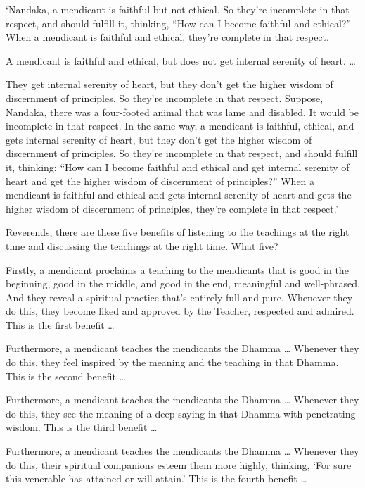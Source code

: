 \documentclass[12pt,openany]{book}%
\begin{document}
‘Nandaka, a mendicant is faithful but not ethical. So they’re incomplete in that respect, and should fulfill it, thinking, “How can I become faithful and ethical?” When a mendicant is faithful and ethical, they’re complete in that respect. 

A mendicant is faithful and ethical, but does not get internal serenity of heart. … 

They get internal serenity of heart, but they don’t get the higher wisdom of discernment of principles. So they’re incomplete in that respect. Suppose, Nandaka, there was a four-footed animal that was lame and disabled. It would be incomplete in that respect. In the same way, a mendicant is faithful, ethical, and gets internal serenity of heart, but they don’t get the higher wisdom of discernment of principles. So they’re incomplete in that respect, and should fulfill it, thinking: “How can I become faithful and ethical and get internal serenity of heart and get the higher wisdom of discernment of principles?” When a mendicant is faithful and ethical and gets internal serenity of heart and gets the higher wisdom of discernment of principles, they’re complete in that respect.’ 

Reverends, there are these five benefits of listening to the teachings at the right time and discussing the teachings at the right time. What five? 

Firstly, a mendicant proclaims a teaching to the mendicants that is good in the beginning, good in the middle, and good in the end, meaningful and well-phrased. And they reveal a spiritual practice that’s entirely full and pure. Whenever they do this, they become liked and approved by the Teacher, respected and admired. This is the first benefit … 

Furthermore, a mendicant teaches the mendicants the Dhamma … Whenever they do this, they feel inspired by the meaning and the teaching in that Dhamma. This is the second benefit … 

Furthermore, a mendicant teaches the mendicants the Dhamma … Whenever they do this, they see the meaning of a deep saying in that Dhamma with penetrating wisdom. This is the third benefit … 

Furthermore, a mendicant teaches the mendicants the Dhamma … Whenever they do this, their spiritual companions esteem them more highly, thinking, ‘For sure this venerable has attained or will attain.’ This is the fourth benefit … 
\end{document}
